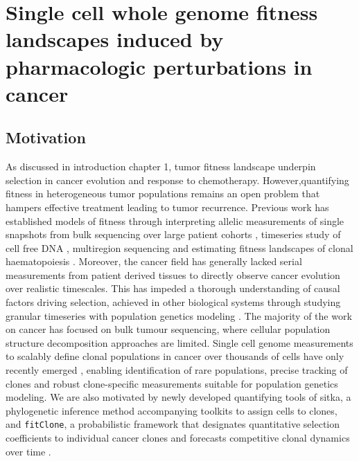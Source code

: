 
{\chapter{Single  cell  whole genome fitness  landscapes  induced  by pharmacologic perturbations in cancer}
}
\label{ch:Chapter4}

\section{Motivation}
As discussed in introduction chapter 1, tumor fitness landscape underpin selection in cancer evolution and response to chemotherapy. However,quantifying fitness in heterogeneous tumor populations remains an open problem that hampers effective treatment leading to tumor recurrence. Previous work has established models of fitness through interpreting allelic measurements of single snapshots \cite{Williams2016-of,Williams2018-ga,Gerstung2020-jl,shah2012clonal,Nik-Zainal2012-uk} from bulk sequencing over large patient cohorts \cite{martincorena2017universal}, timeseries study of cell free DNA \cite{Khan2018-uj}, multiregion sequencing \cite{Gerlinger2014-qd,Jamal-Hanjani2017-yc,Lopez2020-ku,mcpherson2016divergent,williams2018quantification} and estimating fitness landscapes of clonal haematopoiesis \cite{Watson2020-yu}. Moreover, the cancer field has generally lacked serial measurements from patient derived tissues to directly observe cancer evolution over realistic timescales. This has impeded a thorough understanding of causal factors driving selection, achieved in other biological systems through studying granular timeseries with population genetics modeling \cite{Good2017-fv}. The majority of the work on cancer has focused on bulk tumour sequencing, where cellular population structure decomposition approaches are limited. Single cell genome measurements to scalably define clonal populations in cancer over thousands of cells have only recently emerged \cite{Laks2019-dm,zahn2017scalable}, enabling identification of rare populations, precise tracking of clones and robust clone-specific measurements suitable for population genetics modeling. We are also motivated by newly developed quantifying 
tools of sitka, a phylogenetic inference method accompanying toolkits to assign cells to clones, \cite{dorri2020efficient} and 
\texttt{fitClone}, a probabilistic framework that designates quantitative selection coefficients to individual cancer clones and forecasts competitive clonal dynamics over time \cite{salehi2020single}.

